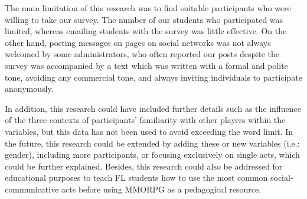 \documentclass[english]{textolivre}
\begin{document}
The main limitation of this research was to find suitable participants who were willing to take our survey. The number of our students who participated was limited, whereas emailing students with the survey was little effective. On the other hand, posting messages on pages on social networks was not always welcomed by some administrators, who often reported our posts despite the survey was accompanied by a text which was written with a formal and polite tone, avoiding any commercial tone, and always inviting individuals to participate anonymously. 

In addition, this research could have included further details such as the influence of the three contexts of participants' familiarity with other players within the variables, but this data has not been used to avoid exceeding the word limit. In the future, this research could be extended by adding these or new variables (i.e.: gender), including more participants, or focusing exclusively on single acts, which could be further explained. Besides, this research could also be addressed for educational purposes to teach FL students how to use the most common social-communicative acts before using MMORPG as a pedagogical resource. 


\printbibliography\label{sec-bib}
\end{document}
